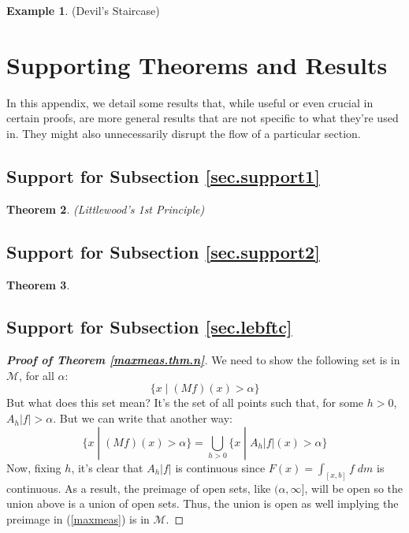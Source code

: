\documentclass[12pt]{article}
\theoremstyle{plain}
\newtheorem{thm}{Theorem}[subsection]
\theoremstyle{definition}
\newtheorem{ex}[thm]{Example}
\theoremstyle{remark}
\begin{document}
\begin{ex} 
\label{devstair}
(Devil's Staircase)
\end{ex}

\newpage
\section{Supporting Theorems and Results}

In this appendix, we detail some results that, while useful or even crucial in certain proofs, are more general results that are not specific to what they're used in.  They might also unnecessarily disrupt the flow of a particular section.

\subsection{Support for Subsection \ref{sec.support1}\label{app.support1}}
\begin{thm}
\label{littlewoods.1st}
\emph{(Littlewood's 1st Principle)}
\end{thm}

\subsection{Support for Subsection \ref{sec.support2}\label{app.support2}}
\begin{thm}
\label{open.intervals}
\end{thm}

\subsection{Support for Subsection \ref{sec.lebftc}\label{app.lebftc}}



\begin{proof}[\textbf{Proof of Theorem \hyperlink{maxmeas.thm}{\ref*{maxmeas.thm.n}}}]
We need to show the following set is in $\mathscr{M}$, for all $\alpha$:
\begin{equation}
    \label{maxmeas}
    \{x\;|\;(Mf)(x)>\alpha\} 
\end{equation}
But what does this set mean? It's the set of all points such that, for some $h>0$, $A_h|f|>\alpha$. But we can write that another way:
\[
    \{x\;|\;(Mf)(x)>\alpha\} = \bigcup_{h>0} 
    \{x \; |\; A_h|f|(x)>\alpha\}
\]
Now, fixing $h$, it's clear that $A_h|f|$ is continuous since $F(x)=\int_{[x,b]} f\; dm$ is continuous. As a result, the preimage of open sets, like $(\alpha,\infty]$, will be open so the union above is a union of open sets. Thus, the union is open as well implying the preimage in (\ref{maxmeas}) is in $\mathscr{M}$.
\end{proof}
\end{document}
